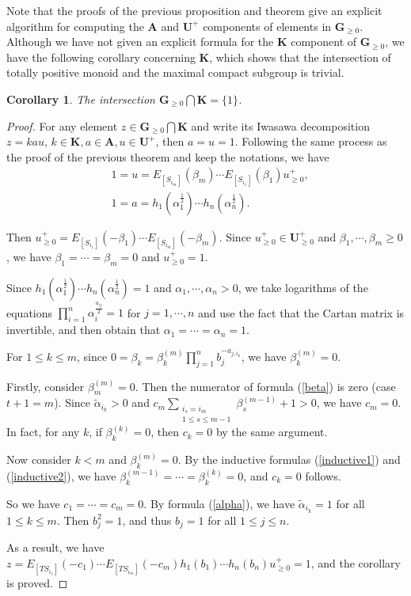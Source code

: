 \documentclass[12pt]{amsart}
\newtheorem{corollary}[theorem]{Corollary}
\begin{document}
Note that the proofs of the previous proposition and theorem  give an explicit algorithm for computing the $\mathbf{A}$ and $\mathbf{U}^+$ components of elements in $\mathbf{G}_{\geq 0}$.
Although we have not given an explicit formula for the $\mathbf{K}$ component of $\mathbf{G}_{\geq 0}$, we have the following corollary concerning $\mathbf{K}$, which shows that the intersection of totally positive monoid and the maximal compact subgroup is trivial.

\begin{corollary}
    The intersection $\mathbf{G}_{\geq 0}\bigcap \mathbf{K}=\{1\}$.
\end{corollary}

\begin{proof}
    For any element $z\in \mathbf{G}_{\geq 0}\bigcap \mathbf{K}$ and write its Iwasawa decomposition $z=kau$, $k\in \mathbf{K},a\in \mathbf{A}, u\in \mathbf{U}^+$, then $a=u=1$.
    Following the same process as the proof of the previous theorem and keep the notations, we have 
    \begin{align*}
    & 1=u=E_{[S_{i_m}]}(\beta_m)\cdots E_{[S_{i_1}]}(\beta_1)u_{\geq 0}^+  ,\\
    & 1=a=h_1(\alpha_1^{\frac{1}{2}})\cdots h_n(\alpha_n^{\frac{1}{2}}) .
\end{align*}

Then $u_{\geq 0}^+=E_{[S_{i_1}]}(-\beta_1)\cdots E_{[S_{i_m}]}(-\beta_m)$.
Since $u_{\geq 0}^+ \in \mathbf{U}_{\geq 0}^+$ and $\beta_1,\cdots,\beta_m\geq 0$, we have $\beta_1=\cdots=\beta_m=0$ and $u_{\geq 0}^+=1$.

Since $h_1(\alpha_1^{\frac{1}{2}})\cdots h_n(\alpha_n^{\frac{1}{2}})=1$ and $\alpha_1,\cdots,\alpha_n>0$, we take logarithms of the equations $\prod_{i=1}^n \alpha_i^{\frac{a_{ij}}{2}}=1$ for $j=1,\cdots,n$ and use the fact that the Cartan matrix is invertible, and then obtain that $\alpha_1=\cdots=\alpha_n=1$.

For $1\leq k\leq m$, since $0=\beta_k=\beta_k^{(m)}\prod_{j=1}^{n}b_j^{-a_{j,i_k}}$, we have $\beta_k^{(m)}=0$.

Firstly, consider $\beta_m^{(m)}=0$.
Then the numerator of formula (\ref{beta}) is zero (case $t+1=m$).
Since $\tilde{\alpha}_{i_k}>0$ and $c_{m}\sum_{\substack{i_s=i_{m}\\1\leq s\leq m-1}} \beta_s^{(m-1)}+1>0$, we have $c_m=0$.
In fact, for any $k$, if $\beta_k^{(k)}=0$, then $c_k=0$ by the same argument.

Now consider $k<m$ and $\beta_k^{(m)}=0$.
By the inductive formulas (\ref{inductive1}) and (\ref{inductive2}), we have $\beta_k^{(m-1)}=\cdots=\beta_k^{(k)}=0$, and $c_k=0$ follows.

So we have $c_1=\cdots=c_m=0$.
By formula (\ref{alpha}), we have $\tilde{\alpha}_{i_k}=1$ for all $1\leq k\leq m$.
Then $b_j^2=1$, and thus $b_j=1$ for all $1\leq j\leq n$.

As a result, we have $z=E_{[TS_{i_1}]}(-c_1)\cdots E_{[TS_{i_m}]}(-c_m)h_1(b_1)\cdots h_n(b_n)u_{\geq 0}^+=1$, and the corollary is proved.
\end{proof}
\end{document}
